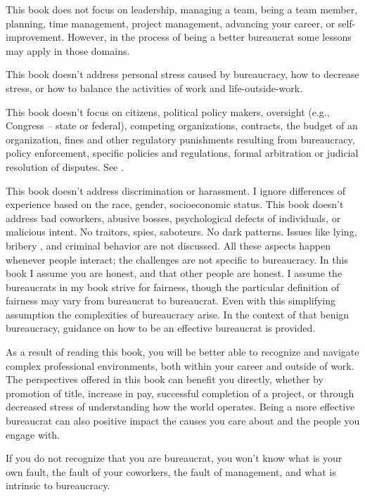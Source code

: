 This book does not focus on leadership, managing a team, being a team member, planning, time management, project management, advancing your career, or self-improvement. However, in the process of being a better bureaucrat some lessons may apply in those domains.

This book doesn't address personal stress caused by bureaucracy, how to decrease stress, or how to balance the activities of work and life-outside-work. 


This book doesn't focus on citizens, political policy makers, oversight (e.g., Congress -- state or federal), competing organizations, contracts, the budget of an organization, fines and other regulatory punishments resulting from bureaucracy, policy enforcement, specific policies and regulations, formal arbitration or judicial resolution of disputes. See \cite{1991_Wilson}.

This book doesn't address discrimination or harassment. I ignore differences of experience based on the race, gender, socioeconomic status. This book doesn't address bad coworkers, abusive bosses, psychological defects of individuals, or malicious intent. No traitors, spies, saboteurs. No dark patterns. Issues like lying, bribery \cite{2021_Ang}, and criminal behavior are not discussed. All these aspects happen whenever people interact; the challenges are not specific to bureaucracy. In this book I assume you are honest, and that other people are honest.  
I assume the bureaucrats in my book strive for fairness, though the particular definition of fairness may vary from bureaucrat to bureaucrat. 
Even with this simplifying assumption the complexities of bureaucracy arise. In the context of that benign bureaucracy, guidance on how to be an effective bureaucrat is provided.


As a result of reading this book, you will be better able to recognize and navigate complex professional environments, both within your career and outside of work. The perspectives offered in this book can benefit you directly, whether by promotion of title, increase in pay, successful completion of a project, or through decreased stress of understanding how the world operates. Being a more effective bureaucrat can also positive impact the causes you care about and the people you engage with.

If you do not recognize that you are bureaucrat, you won't know what is your own fault, the fault of your coworkers, the fault of management, and what is intrinsic to bureaucracy. 

